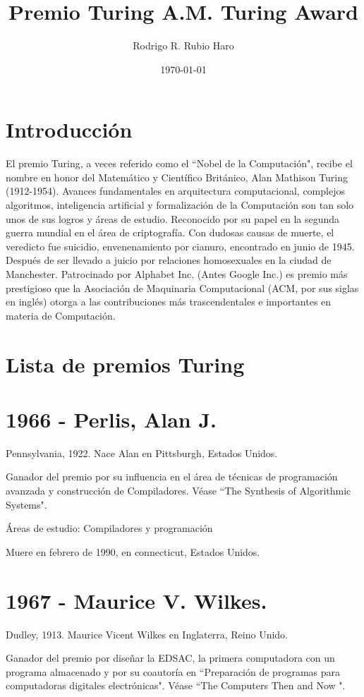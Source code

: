 \documentclass[notitlepage,letterpaper, 11pt]{article}
\title{Premio Turing \textbar \hspace{.1mm} A.M. Turing Award}
\author{Rodrigo R. Rubio Haro}
\date{\today} %
\begin{document}

\newpage

\section*{Introducción}
El premio Turing, a veces referido como el ``Nobel de la Computación", recibe el nombre en honor del Matemático y Científico Británico, Alan Mathison Turing (1912-1954). Avances fundamentales en arquitectura computacional, complejos algoritmos, inteligencia artificial y formalización de la Computación son tan solo unos de sus logros y áreas de estudio. Reconocido por su papel en la segunda guerra mundial en el área de criptografía. Con dudosas causas de muerte, el veredicto fue suicidio, envenenamiento por cianuro, encontrado en junio de 1945. Después de ser llevado a juicio por relaciones homosexuales en la ciudad de Manchester.
Patrocinado por Alphabet Inc. (Antes Google Inc.) es premio más prestigioso que la Asociación de Maquinaria Computacional (ACM, por sus siglas en inglés) otorga a las contribuciones más trascendentales e importantes en materia de Computación.


\section*{Lista de premios Turing}

\section*{1966 - Perlis, Alan J.}
\noindent Pennsylvania, 1922. Nace Alan en Pittsburgh, Estados Unidos.

\noindent Ganador del premio por su influencia en el área de técnicas de programación avanzada y construcción de Compiladores. Véase ``The Synthesis of Algorithmic Systems". 

\noindent Áreas de estudio: Compiladores y programación

\noindent Muere en febrero de 1990, en connecticut, Estados Unidos.
\newline

\section*{1967 - Maurice V. Wilkes.}
\noindent Dudley, 1913. Maurice Vicent Wilkes en Inglaterra, Reino Unido. 

\noindent Ganador del premio por diseñar la EDSAC, la primera computadora con un programa almacenado y por su coautoría en ``Preparación de programas para computadoras digitales electrónicas". Véase ``The Computers Then and Now ".
\end{document}

